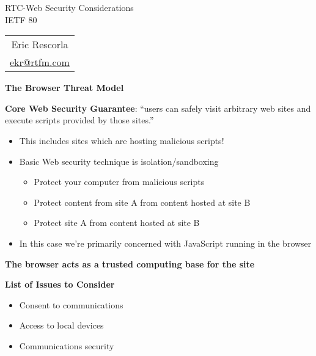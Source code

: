 \documentclass[helvetica]{seminar}
\newcommand{\heading}[1]{%
  \begin{center} 
    \large\bf 
    #1 
  \end{center} 
  \vspace{.4 in}}
\begin{document}
\begin{slide}
\begin{center}
\vspace{1 in}
\LARGE{{\bf}RTC-Web Security Considerations}\\
\vspace{.2in}
\large{{IETF 80}} \\
\vspace{3em}
\large{
\begin{tabular}{c}
Eric Rescorla \\
\url{ekr@rtfm.com}
\end{tabular}
}
\end{center}

\end{slide}


\centerslidesfalse 


\begin{slide}
\heading{The Browser Threat Model}

\textbf{Core Web Security Guarantee}: ``users can safely visit arbitrary web sites
and execute scripts provided by those sites.''\cite{huang-cache}

\vspace{1em}

\begin{itemize}
\item This includes sites which are hosting malicious scripts!
\item Basic Web security technique is isolation/sandboxing
  \begin{itemize}
  \item Protect your computer from malicious scripts
  \item Protect content from site A from content hosted at site B
  \item Protect site A from content hosted at site B
  \end{itemize}
\item In this case we're primarily concerned with JavaScript running in the browser
\end{itemize}

\textbf{The browser acts as a trusted computing base for the site}

\end{slide}



\begin{slide}
\heading{List of Issues to Consider}

\begin{itemize}
\item Consent to communications
\item Access to local devices
\item Communications security
\end{itemize}
              
\end{slide}
\end{document}

